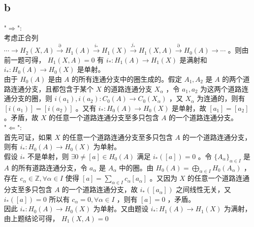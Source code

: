 \documentclass[12pt]{article}
\begin{document}
\subsection{b}
"$\Rightarrow$":\\
考虑正合列 $\cdots\to H_{2}(X,A)\stackrel{\partial}{\to} H_1(A)\stackrel{i_*}{\to} H_1(X)\stackrel{j_*}{\to}H_1(X,A)\stackrel{\partial}{\to} H_0(A)\to\cdots$ 。则由前一题可得， $H_1(X,A)=0$ 有 $i_*:H_1(A)\to H_1(X)$ 是满射和 $i_*:H_0(A)\to H_0(X)$ 是单射。\\
由于 $H_0(A)$ 是由 $A$ 的所有连通分支中的圈生成的。假定 $A_1,A_2$ 是 $A$ 的两个道路连通分支，且都包含于某个 $X$ 的道路连通分支 $X_\alpha$ ，令 $a_1,a_2$ 为这两个道路连通分支的圈，则 $i(a_1),i(a_2):C_0(A)\to C_0(X_\alpha)$ ，又 $X_\alpha$ 为连通的，则有 $[i(a_1)]=[i(a_2)]$ 。又有 $i_*:H_0(A)\to H_0(X)$ 是单射，故 $[a_1]=[a_2]$ 。矛盾，故 $X$ 的任意一个道路连通分支至多只包含 $A$ 的一个道路连通分支。\\
"$\Leftarrow$":\\
首先可证，如果 $X$ 的任意一个道路连通分支至多只包含 $A$ 的一个道路连通分支，则有 $i_*:H_0(A)\to H_0(X)$ 为单射。\\
假设 $i_*$ 不是单射，则 $\exists 0\neq [a]\in H_0(A)$ 满足 $i_*([a])=0$ 。令 $\{A_\alpha\}_{\alpha\in I}$ 是 $A$ 的所有道路连通分支，令 $a_\alpha$ 是 $A_\alpha$ 中的圈。由 $H_0(A)=\bigoplus_{\alpha\in I} H_0(A_\alpha)$ ，存在 $c_\alpha\in \mathbb{Z},\forall \alpha \in I$ 使得 $[a]=\sum_{\alpha \in I} c_\alpha [a_\alpha]$ 。又因为 $X$ 的任意一个道路连通分支至多只包含 $A$ 的一个道路连通分支，故 $i_*([a_\alpha])$ 之间线性无关，又 $i_*([a])=0$ 所以有 $c_\alpha=0,\forall \alpha\in I$ ，则有 $[a]=0$ ，矛盾。\\
因此 $i_*:H_0(A)\to H_0(X)$ 为单射。又由题设 $i_*:H_1(A)\to H_1(X)$ 为满射，由上题结论可得， $H_1(X,A)=0$
\end{document}
